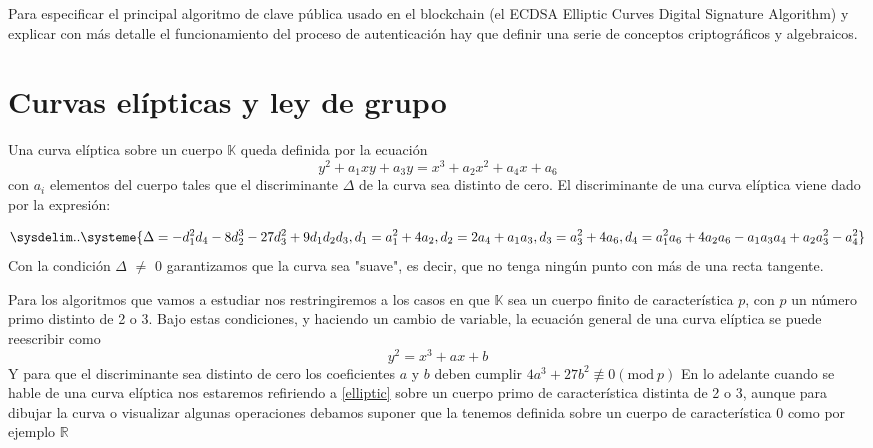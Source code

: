 Para especificar el principal algoritmo de clave pública usado en el blockchain (el ECDSA Elliptic Curves Digital Signature Algorithm)\citep{elliptic_cripto} y explicar con más detalle el funcionamiento del proceso de autenticación hay que definir una serie de conceptos criptográficos y algebraicos. 
\section{Curvas elípticas y ley de grupo}\label{curvas_grupo}
\theoremstyle{definition}\begin{definition}\label{curv_ellipt}
Una curva elíptica sobre un cuerpo $\mathbb{K}$ queda definida por la ecuación \[y^2 +a_1xy+a_3 y = x^3 +a_2x^2 +a_4x +a_6\] con $a_i$ elementos del cuerpo tales que el discriminante $\Delta$ de la curva sea distinto de cero.
El discriminante de una curva elíptica viene dado por la expresión:

\begin{equation*}
  \sysdelim..\systeme{
  \Delta = -d_1^2d_4 - 8d_2^3 - 27d_3^2 + 9d_1d_2d_3,
  d_1 = a_1^2 + 4a_2,
  d_2 = 2a_4 + a_1a_3,
  d_3 = a_3^2 + 4a_6,
  d_4 = a_1^2a_6 + 4a_2a_6 - a_1a_3a_4 + a_2a_3^2 - a_4^2
  }
\end{equation*}
Con la condición $\Delta$ $\neq$ 0 garantizamos que la curva sea "suave", es decir, que no tenga ningún punto con más de una recta tangente.
\end{definition} Para los algoritmos que vamos a estudiar nos restringiremos a los casos en que $\mathbb{K}$ sea un cuerpo finito de característica $p$, con $p$ un número primo distinto de 2 o 3. Bajo estas condiciones, y haciendo un cambio de variable, la ecuación general de una curva elíptica se puede reescribir como \begin{equation} \label{elliptic}y^2 = x^3 + ax + b \end{equation} Y para que el discriminante sea distinto de cero los coeficientes $a$ y $b$ deben cumplir $4a^3 + 27b^2 \not\equiv 0(\textrm{mod}\ p)$ En lo adelante cuando se hable de una curva elíptica nos estaremos refiriendo a \ref{elliptic} sobre un cuerpo primo de característica distinta de 2 o 3, aunque para dibujar la curva o visualizar algunas operaciones debamos suponer que la tenemos definida sobre un cuerpo de característica 0 como por ejemplo $\mathbb{R}$

